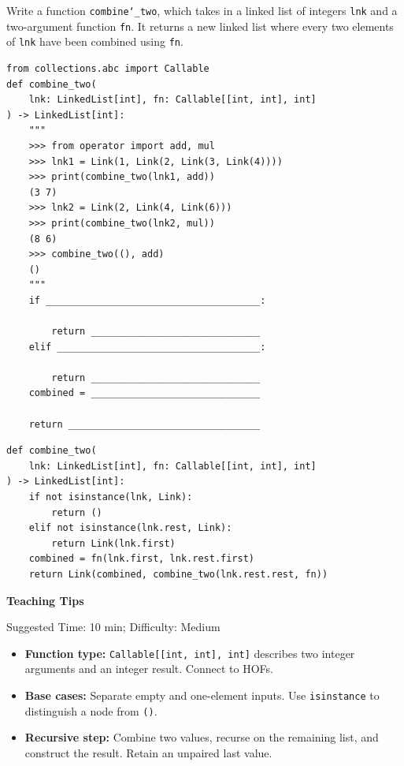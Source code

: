 \begin{blocksection}
\question Write a function \texttt{combine\char`_two}, which takes in a linked list of integers \texttt{lnk} and a two-argument function \texttt{fn}. It returns a new linked list where every two elements of \texttt{lnk} have been combined using \texttt{fn}.\\

\begin{lstlisting}
from collections.abc import Callable
def combine_two(
    lnk: LinkedList[int], fn: Callable[[int, int], int]
) -> LinkedList[int]:
    """
    >>> from operator import add, mul
    >>> lnk1 = Link(1, Link(2, Link(3, Link(4))))
    >>> print(combine_two(lnk1, add))
    (3 7)
    >>> lnk2 = Link(2, Link(4, Link(6)))
    >>> print(combine_two(lnk2, mul))
    (8 6)
    >>> combine_two((), add)
    ()
    """
    if ______________________________________:

        return ______________________________
    elif ____________________________________:

        return ______________________________
    combined = ______________________________

    return __________________________________
\end{lstlisting}

\begin{solution}[1in]
\begin{lstlisting}
def combine_two(
    lnk: LinkedList[int], fn: Callable[[int, int], int]
) -> LinkedList[int]:
    if not isinstance(lnk, Link):
        return ()
    elif not isinstance(lnk.rest, Link):
        return Link(lnk.first)
    combined = fn(lnk.first, lnk.rest.first)
    return Link(combined, combine_two(lnk.rest.rest, fn))
\end{lstlisting}
\end{solution}

\end{blocksection}

\begin{questionmeta}
\textbf{Teaching Tips}\par\nopagebreak[4]
Suggested Time: 10 min; Difficulty: Medium
\nopagebreak[4]
\begin{itemize}
    \item \textbf{Function type:} \lstinline{Callable[[int, int], int]}
    describes two integer arguments and an integer result. Connect to HOFs.
    \item \textbf{Base cases:} Separate empty and one-element inputs.
    Use \lstinline{isinstance} to distinguish a node from \lstinline{()}.
    \item \textbf{Recursive step:} Combine two values, recurse on the
    remaining list, and construct the result. Retain an unpaired last value.
\end{itemize}
\end{questionmeta}
